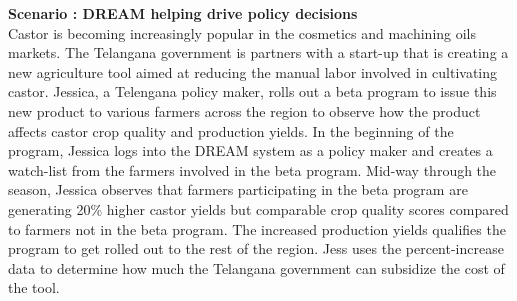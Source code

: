 \begin{flushleft}
\textbf{Scenario : DREAM helping drive policy decisions}\\\smallskip
Castor is becoming increasingly popular in the cosmetics and machining oils markets. The Telangana government is partners with a start-up that is creating a new agriculture tool aimed at reducing the manual labor involved in cultivating castor. Jessica, a Telengana policy maker, rolls out a beta program to issue this new product to various farmers across the region to observe how the product affects castor crop quality and production yields. In the beginning of the program, Jessica logs into the DREAM system as a policy maker and creates a watch-list from the farmers involved in the beta program. Mid-way through the season, Jessica observes that farmers participating in the beta program are generating 20\% higher castor yields but comparable crop quality scores compared to farmers not in the beta program. The increased production yields qualifies the program to get rolled out to the rest of the region. Jess uses the percent-increase data to determine how much the Telangana government can subsidize the cost of the tool. 
\end{flushleft}
